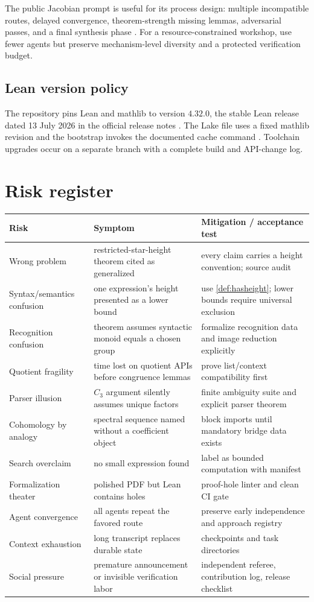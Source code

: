 \documentclass{amsart}
\begin{document}
The public Jacobian prompt is useful for its process design: multiple incompatible routes, delayed convergence, theorem-strength missing lemmas, adversarial passes, and a final synthesis phase \cite{jacobianPrompt2026}.  For a resource-constrained workshop, use fewer agents but preserve mechanism-level diversity and a protected verification budget.

\subsection{Lean version policy}

The repository pins Lean and mathlib to version $4.32.0$, the stable Lean release dated 13 July 2026 in the official release notes \cite{leanReleaseNotes2026}.  The Lake file uses a fixed mathlib revision and the bootstrap invokes the documented cache command  \cite{mathlibDependency2026}.  Toolchain upgrades occur on a separate branch with a complete build and API-change log.

\section{Risk register}

\begin{longtable}{@{}p{}p{}p{}@{}}
\toprule
Risk & Symptom & Mitigation / acceptance test\\
\midrule
\endhead
Wrong problem & restricted-star-height theorem cited as generalized & every claim carries a height convention; source audit\\
Syntax/semantics confusion & one expression's height presented as a lower bound & use \cref{def:hasheight}; lower bounds require universal exclusion\\
Recognition confusion & theorem assumes syntactic monoid equals a chosen group & formalize recognition data and image reduction explicitly\\
Quotient fragility & time lost on quotient APIs before congruence lemmas & prove list/context compatibility first\\
Parser illusion & $C_3$ argument silently assumes unique factors & finite ambiguity suite and explicit parser theorem\\
Cohomology by analogy & spectral sequence named without a coefficient object & block imports until mandatory bridge data exists\\
Search overclaim & no small expression found & label as bounded computation with manifest\\
Formalization theater & polished PDF but Lean contains holes & proof-hole linter and clean CI gate\\
Agent convergence & all agents repeat the favored route & preserve early independence and approach registry\\
Context exhaustion & long transcript replaces durable state & checkpoints and task directories\\
Social pressure & premature announcement or invisible verification labor & independent referee, contribution log, release checklist\\
\bottomrule
\end{longtable}
\end{document}
